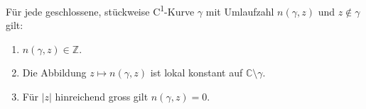\begin{lemma}
    Für jede geschlossene, stückweise C\textsuperscript{1}-Kurve $\gamma$ mit Umlaufzahl $n(\gamma, z)$ und $z \notin \gamma$ gilt:
    \begin{enumerate}
        \item $n(\gamma, z) \in \mathbb{Z}$.
        \item Die Abbildung $z \mapsto n(\gamma, z)$ ist lokal konstant auf $\mathbb{C} \setminus \gamma$.
        \item Für $|z|$ hinreichend gross gilt $n(\gamma, z) = 0$.
    \end{enumerate}

\end{lemma}
